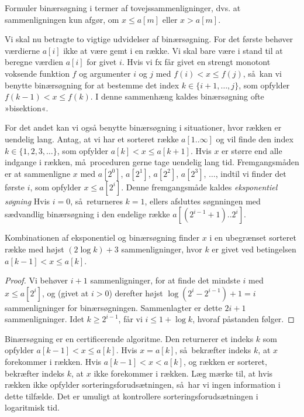 \begin{exerc} 
  Formuler binærsøgning i termer af tovejssammenligninger,
  dvs. at sammenligningen kun afgør, om $x \le a[m]$ eller $x > a[m]$.
\end{exerc}

Vi skal nu betragte to vigtige udvidelser af binærsøgning.
For det første behøver værdierne $a[i]$ ikke at være gemt i en række. 
Vi skal bare være i stand til at beregne værdien $a[i]$ for givet $i$. 
Hvis vi fx får givet en strengt monotont voksende funktion $f$ og argumenter $i$ og $j$ med
 $f(i) < x \le f(j)$, så kan vi benytte binærsøgning for at bestemme det index $k\in\{i+1,\ldots, j\}$, som opfylder $f(k-1) < x \le f(k)$.
I denne sammenhæng kaldes binærsøgning ofte »bisektion«.

For det andet kan vi også benytte binærsøgning i situationer, hvor rækken er uendelig lang.
Antag, at vi har et sorteret række $a[1 .. \infty]$ og vil finde den index $k\in\{1,2,3,\ldots\}$, som opfylder $a[k] < x \le a[k+1]$.
Hvis $x$ er større end alle indgange i rækken, må proceduren gerne tage uendelig lang tid.
Fremgangsmåden er at sammenligne $x$ med $a[2^0]$, $a[2^1]$, $a[2^2]$, $a[2^3]$, $\ldots$, indtil vi finder det første $i$, som opfylder $x \le a[2^i]$.
Denne fremgangsmåde kaldes \emph{eksponentiel søgning}
Hvis $i=0$, så returneres $k=1$, ellers afsluttes søgnningen med sædvandlig binærsøgning i den endelige række $a[(2^{i-1}+1) .. 2^i]$.


\begin{thm} %
  Kombinationen af eksponentiel og binærsøgning finder $x$ i en ubegrænset sorteret række med højst $(2 \log k) + 3$ sammenligninger, hvor $k$ er givet ved betingelsen $a[k-1] < x \le a[k]$.
\end{thm}

\begin{proof}
  Vi behøver $i+1$ sammenligninger, for at finde det mindste $i$ med $x \le a[2^i]$, og (givet at $i>0$) derefter højst $\log(2^i - 2^{i-1}) + 1=i$ sammenligninger for binærsøgningen. 
  Sammenlagter er dette $2i + 1$ sammenligninger. 
  Idet $k \ge 2^{i-1}$, får vi $i \le 1 + \log k$, hvoraf påstanden følger.
\end{proof}

Binærsøgning er en certificerende algoritme.
Den returnerer et indeks $k$ som opfylder $a[k-1] < x \le a[k]$. 
Hvis $x = a[k]$, så bekræfter indeks $k$, at $x$ forekommer i rækken.
Hvis $a[k-1] < x < a[k]$, og rækken er sorteret, bekræfter indeks $k$, at $x$ ikke forekommer i rækken.
Læg mærke til, at hvis rækken ikke opfylder sorteringsforudsætningen, så har vi ingen information i dette tilfælde. 
Det er umuligt at kontrollere sorteringsforudsætningen i logaritmisk tid.

